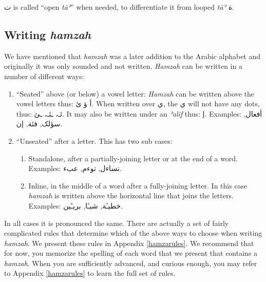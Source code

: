 \documentclass[
  10pt,
]{book}
\providecommand{\tightlist}{%
  \setlength{\itemsep}{0pt}\setlength{\parskip}{0pt}}
\begin{document}
\foreignlanguage{arabic}{ت} is called \enquote{open \emph{tāʾ}} when needed, to differentiate it from looped \emph{tāʾ} \foreignlanguage{arabic}{ة}.

\subsection{\texorpdfstring{Writing \emph{hamzah}}{Writing hamzah}}\label{writing-hamzah}

We have mentioned that \emph{hamzah} was a later addition to the Arabic alphabet and originally it was only sounded and not written. \emph{Hamzah} can be written in a number of different ways:

\begin{enumerate}
\def\labelenumi{\arabic{enumi}.}
\tightlist
\item
  \enquote{Seated} above (or below) a vowel letter: \emph{Hamzah} can be written above the vowel letters thus: \foreignlanguage{arabic}{أ ؤ ئ}. When written over \foreignlanguage{arabic}{ي}, the \foreignlanguage{arabic}{ي} will not have any dots, thus: \foreignlanguage{arabic}{ئـ، ـئـ، ـئ}. It may also be written under an \emph{ʾalif} thus: \foreignlanguage{arabic}{إ}. Examples: \foreignlanguage{arabic}{أفعال}, \foreignlanguage{arabic}{سؤلک}, \foreignlanguage{arabic}{فئة}, \foreignlanguage{arabic}{إن}.
\item
  \enquote{Unseated} after a letter. This has two sub cases:

  \begin{enumerate}
  \def\labelenumii{\alph{enumii}.}
  \tightlist
  \item
    Standalone, after a partially-joining letter or at the end of a word. Examples: \foreignlanguage{arabic}{تساءل}, \foreignlanguage{arabic}{توءم}, \foreignlanguage{arabic}{عبء}.
  \item
    Inline, in the middle of a word after a fully-joining letter. In this case \emph{hamzah} is written above the horizontal line that joins the letters. Examples: \foreignlanguage{arabic}{خطيـٔة}, \foreignlanguage{arabic}{شيـٔا}, \foreignlanguage{arabic}{بريـٔين}.
  \end{enumerate}
\end{enumerate}

In all cases it is pronounced the same. There are actually a set of fairly complicated rules that determine which of the above ways to choose when writing \emph{hamzah}. We present these rules in Appendix \ref{hamzarules}. We recommend that for now, you memorize the spelling of each word that we present that contains a \emph{hamzah}. When you are sufficiently advanced, and curious enough, you may refer to Appendix \ref{hamzarules} to learn the full set of rules.
\end{document}
